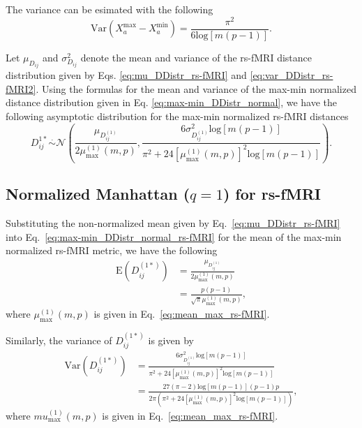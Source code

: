 \documentclass[10pt,letterpaper]{article}\usepackage[]{graphicx}\usepackage[]{color}
\begin{document}
The variance can be esimated with the following
%
\begin{equation}\label{eq:var_max_rs-fMRI}
\text{Var}\left(X^\text{max}_a - X^\text{min}_a\right) = \frac{\pi^2}{6\text{log}[m(p-1)]}.
\end{equation}

Let $\mu_{D_{ij}}$ and $\sigma^2_{D_{ij}}$ denote the mean and variance of the rs-fMRI distance distribution given by Eqs. \ref{eq:mu_DDistr_rs-fMRI} and \ref{eq:var_DDistr_rs-fMRI2}. Using the formulas for the mean and variance of the max-min normalized distance distribution given in Eq. \ref{eq:max-min_DDistr_normal}, we have the following asymptotic distribution for the max-min normalized rs-fMRI distances
%
\begin{equation}\label{eq:max-min_DDistr_normal_rs-fMRI}
D^{1*}_{ij} \overset{.}{\sim} \mathcal{N}\left(\frac{\mu_{D^{(1)}_{ij}}}{2\mu^{(1)}_\text{max}(m,p)}, \frac{6\sigma^2_{D^{(1)}_{ij}}\text{log}[m(p-1)]}{\pi^2 + 24\left[\mu^{(1)}_\text{max}(m,p)\right]^2\text{log}[m(p-1)]}\right).
\end{equation}

\subsection{Normalized Manhattan \texorpdfstring{($q=1$)}{} for rs-fMRI}

Substituting the non-normalized mean given by Eq.~\ref{eq:mu_DDistr_rs-fMRI} into Eq.~\ref{eq:max-min_DDistr_normal_rs-fMRI} for the mean of the max-min normalized rs-fMRI metric, we have the following
%
\begin{equation}
\begin{aligned}
\text{E}\left(D^{(1*)}_{ij}\right) &= \frac{\mu_{D^{(1)}_{ij}}}{2\mu^{(1)}_\text{max}(m,p)} \\
&= \frac{p(p-1)}{\sqrt{\pi}\mu^{(1)}_\text{max}(m,p)},
\end{aligned}
\end{equation}
where $\mu^{(1)}_\text{max}(m,p)$ is given in Eq.~\ref{eq:mean_max_rs-fMRI}.

Similarly, the variance of $D^{(1*)}_{ij}$ is given by
%
\begin{equation}
\begin{aligned}
\text{Var}\left(D^{(1*)}_{ij}\right) &= \frac{6\sigma^2_{D^{(1)}_{ij}}\text{log}[m(p-1)]}{\pi^2 + 24\left[\mu^{(1)}_\text{max}(m,p)\right]^2\text{log}[m(p-1)]} \\
&= \frac{27(\pi-2)\text{log}[m(p-1)](p-1)p}{2\pi\left(\pi^2 + 24\left[\mu^{(1)}_\text{max}(m,p)\right]^2\text{log}[m(p-1)]\right)},
\end{aligned}
\end{equation}
where $mu^{(1)}_\text{max}(m,p)$ is given in Eq.~\ref{eq:mean_max_rs-fMRI}.
\end{document}
